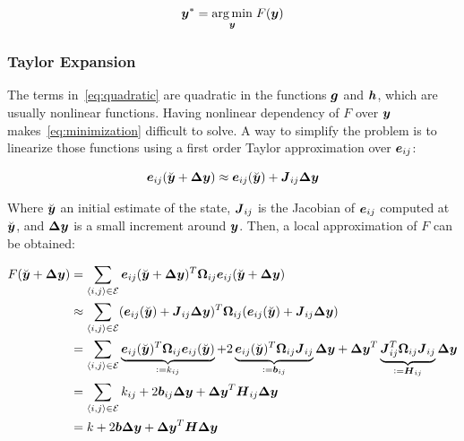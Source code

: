 \begin{equation}
\boldsymbol{y}^* = \underset{\boldsymbol{y}}{\arg\min} \;F(\boldsymbol{y})
\label{eq:minimization}
\end{equation}

\subsubsection{Taylor Expansion}

The terms in~\eqref{eq:quadratic} are quadratic in the functions $\boldsymbol{g}$ and $\boldsymbol{h}$, which are usually nonlinear functions. Having nonlinear dependency of $F$ over $\boldsymbol{y}$ makes~\eqref{eq:minimization} difficult to solve. A way to simplify the problem is to linearize those functions using a first order Taylor approximation over $\boldsymbol{e}_{ij}$:

\begin{equation}
\boldsymbol{e}_{ij}(\breve{\boldsymbol{y}}+\boldsymbol{\Delta y}) \approx \boldsymbol{e}_{ij}(\breve{\boldsymbol{y}}) + \boldsymbol{J}_{ij}\boldsymbol{\Delta y}
\end{equation}

Where $\breve{\boldsymbol{y}}$ an initial estimate of the state, $\boldsymbol{J}_{ij}$ is the Jacobian of $\boldsymbol{e}_{ij}$ computed at $\breve{\boldsymbol{y}}$, and $\boldsymbol{\Delta y}$ is a small increment around $\boldsymbol{y}$. Then, a local approximation of $F$ can be obtained:

\begin{align}
F(\breve{\boldsymbol{y}}+\boldsymbol{\Delta y}) &= \sum_{\left<i,j\right>\in\mathcal{E}}
\boldsymbol{e}_{ij}(\breve{\boldsymbol{y}}+\boldsymbol{\Delta y})^T\boldsymbol{\Omega}_{ij} 
\boldsymbol{e}_{ij}(\breve{\boldsymbol{y}}+\boldsymbol{\Delta y}) \notag \\
& \approx \sum_{\left<i,j\right>\in\mathcal{E}} 
(\boldsymbol{e}_{ij}(\breve{\boldsymbol{y}}) + \boldsymbol{J}_{ij}\boldsymbol{\Delta y})^T \boldsymbol{\Omega}_{ij}
(\boldsymbol{e}_{ij}(\breve{\boldsymbol{y}}) + \boldsymbol{J}_{ij}\boldsymbol{\Delta y})\notag \\
&= \sum_{\left<i,j\right>\in\mathcal{E}}
\underbrace{\boldsymbol{e}_{ij}(\breve{\boldsymbol{y}})^T\boldsymbol{\Omega}_{ij}\boldsymbol{e}_{ij}(\breve{\boldsymbol{y}})}_{\vcentcolon= k_{ij}}
+2\underbrace{\boldsymbol{e}_{ij}(\breve{\boldsymbol{y}})^T\boldsymbol{\Omega}_{ij}\boldsymbol{J}_{ij}}_{ \vcentcolon= \boldsymbol{b}_{ij}}\boldsymbol{\Delta y}
+\boldsymbol{\Delta y}^T
\underbrace{\boldsymbol{J}_{ij}^T\boldsymbol{\Omega}_{ij}\boldsymbol{J}_{ij}}_{\vcentcolon= \boldsymbol{H}_{ij}}
\boldsymbol{\Delta y} \notag \\
&= \sum_{\left<i,j\right>\in\mathcal{E}} k_{ij} + 2\boldsymbol{b}_{ij}\boldsymbol{\Delta y} + \boldsymbol{\Delta y}^T \boldsymbol{H}_{ij} \boldsymbol{\Delta y} \notag \\
&= k + 2\boldsymbol{b} \boldsymbol{\Delta y} + \boldsymbol{\Delta y}^T \boldsymbol{H} \boldsymbol{\Delta y}
\label{eq:linearized}
\end{align}

